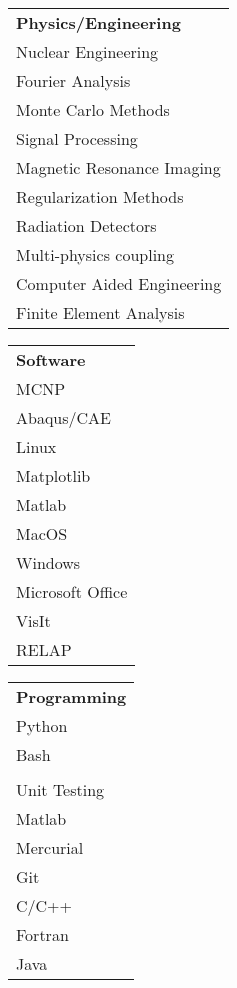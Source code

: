 \\[2mm]
\begin{minipage}{0.32\textwidth}
\begin{tabular}{l}
	{\large\textbf{Physics/Engineering}} \\
	\highskillbw Nuclear Engineering \\
	\highskillbw Fourier Analysis \\ 
	\highskillbw Monte Carlo Methods \\
	\medskillbw Signal Processing \\
	\medskillbw Magnetic Resonance Imaging \\ 
	\medskillbw Regularization Methods  \\
	\medskillbw Radiation Detectors \\
	\lowskillbw Multi-physics coupling \\
	\lowskillbw Computer Aided Engineering \\
	\lowskillbw Finite Element Analysis \\
\end{tabular}
\end{minipage}%
\begin{minipage}{0.20\textwidth}
	\begin{center}
\begin{tabular}{l}
	{\large\textbf{Software}} \\
	\highskillbw \textsc{MCNP} \\
	\highskillbw Abaqus/CAE \\
	\highskillbw Linux \\ 
	\highskillbw Matplotlib \\ 
	\highskillbw Matlab \\
	\highskillbw MacOS \\
	\medskillbw Windows \\
	\medskillbw Microsoft Office \\
	\lowskillbw VisIt \\
	\lowskillbw RELAP
\end{tabular}
	\end{center}
\end{minipage}%
\begin{minipage}{0.20\textwidth}
	\begin{center}
\begin{tabular}{l}
	{\large\textbf{Programming}} \\
	\highskillbw Python \\
	\highskillbw Bash \\ 
	\highskillbw {\fontfamily{ptm}\selectfont \LaTeX} \\ 
	\highskillbw Unit Testing \\
	\highskillbw Matlab \\
	\highskillbw Mercurial \\
	\medskillbw Git \\
	\medskillbw C/C++ \\
	\medskillbw Fortran \\
	\lowskillbw Java \\
\end{tabular}
	\end{center}
\end{minipage}%
